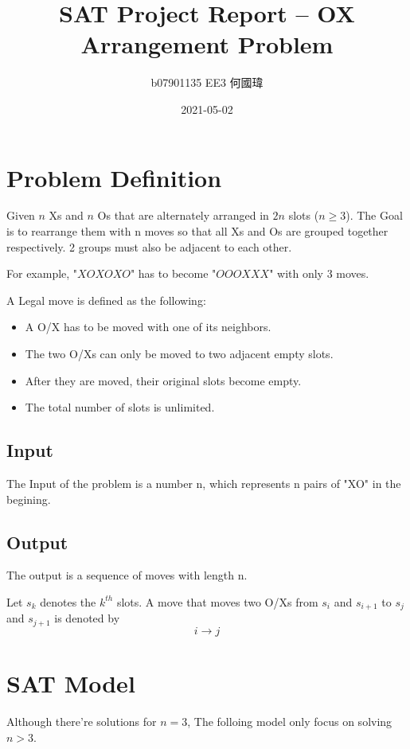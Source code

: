 \documentclass{article}
\title{SAT Project Report -- OX Arrangement Problem}
\author{b07901135 EE3 何國瑋}
\date{2021-05-02}
\begin{document}
    \maketitle

    \section{Problem Definition}


    Given $n$ Xs and $n$ Os that are alternately arranged in $2n$ slots ($n\geq 3$).
    The Goal is to rearrange them with n moves 
    so that all Xs and Os are grouped together respectively.
    2 groups must also be adjacent to each other.

    For example, "$XOXOXO$" has to become "$OOOXXX$" with only 3 moves.

    A Legal move is defined as the following:
    \begin{itemize}
        \item A O/X has to be moved with one of its neighbors.
        \item The two O/Xs can only be moved to two adjacent empty slots.
        \item After they are moved, their original slots become empty.
        \item The total number of slots is unlimited.
    \end{itemize}

    \subsection{Input}
    The Input of the problem is a number n, which represents
    n pairs of "XO" in the begining.

    \subsection{Output}
    The output is a sequence of moves with length n.

    Let $s_k$ denotes the $k^{th}$ slots.
    A move that moves two O/Xs from $s_i$ and $s_{i+1}$ to 
    $s_j$ and $s_{j+1}$ is denoted by
    $$i \rightarrow j$$
        

    \section{SAT Model}

    Although there're solutions for $n=3$, The folloing model only
    focus on solving $n>3$.
\end{document}
